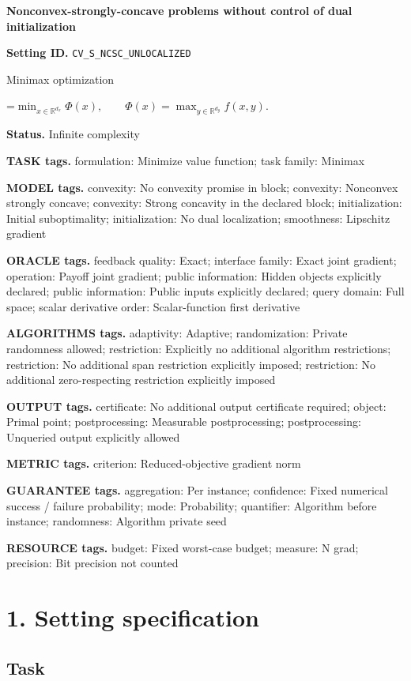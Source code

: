 \documentclass[10pt,a4paper]{article}
\newcommand{\AtlasMath}[1]{\par\begingroup\centering\setbox0=\hbox{$\displaystyle #1$}\ifdim\wd0>1.4\linewidth\typeout{ATLAS WIDE FORMULA: \the\wd0}\fi\ifdim\wd0>\linewidth\resizebox{\linewidth}{!}{\box0}\else\box0\fi\par\endgroup}
\begin{document}
\raggedright

{\LARGE\bfseries\sffamily\color{AtlasNavy} Nonconvex-strongly-concave problems without control of dual initialization\par}\vspace{5pt}
\textbf{Setting ID.} \texttt{CV\_\allowbreak{}S\_\allowbreak{}NCSC\_\allowbreak{}UNLOCALIZED}

Minimax optimization


\AtlasMath{\min_{x\in\mathbb{R}^{d_x}}\Phi(x),\qquad\Phi(x)=\max_{y\in\mathbb{R}^{d_y}}f(x,y).}


\textbf{Status.} Infinite complexity

\textbf{TASK tags.} formulation: Minimize value function; task family: Minimax

\textbf{MODEL tags.} convexity: No convexity promise in block; convexity: Nonconvex strongly concave; convexity: Strong concavity in the declared block; initialization: Initial suboptimality; initialization: No dual localization; smoothness: Lipschitz gradient

\textbf{ORACLE tags.} feedback quality: Exact; interface family: Exact joint gradient; operation: Payoff joint gradient; public information: Hidden objects explicitly declared; public information: Public inputs explicitly declared; query domain: Full space; scalar derivative order: Scalar-function first derivative

\textbf{ALGORITHMS tags.} adaptivity: Adaptive; randomization: Private randomness allowed; restriction: Explicitly no additional algorithm restrictions; restriction: No additional span restriction explicitly imposed; restriction: No additional zero-respecting restriction explicitly imposed

\textbf{OUTPUT tags.} certificate: No additional output certificate required; object: Primal point; postprocessing: Measurable postprocessing; postprocessing: Unqueried output explicitly allowed

\textbf{METRIC tags.} criterion: Reduced-objective gradient norm

\textbf{GUARANTEE tags.} aggregation: Per instance; confidence: Fixed numerical success / failure probability; mode: Probability; quantifier: Algorithm before instance; randomness: Algorithm private seed

\textbf{RESOURCE tags.} budget: Fixed worst-case budget; measure: N grad; precision: Bit precision not counted

\section{1. Setting specification}
\subsection{Task}
\end{document}
